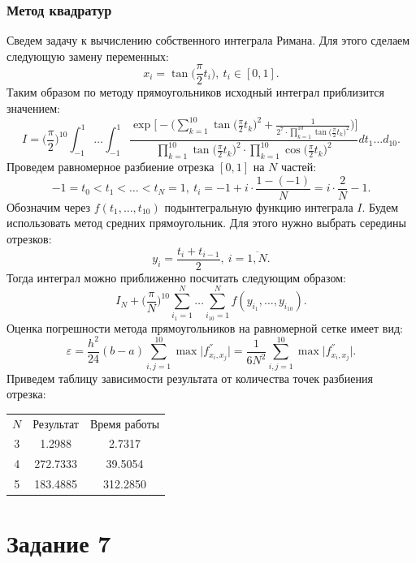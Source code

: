 \documentclass[11pt]{article}
\begin{document}
\subsubsection{Метод квадратур}
Сведем задачу к вычислению собственного интеграла Римана. Для этого сделаем следующую замену переменных:
\[ x_i = \tan\bigg(\frac{\pi}{2}t_i \bigg), \ t_i \in [0,1]. \]
Таким образом по методу прямоугольников исходный интеграл приблизится значением:
\[ I = \bigg(\frac{\pi}{2} \bigg)^{10} \int_{-1}^{1}\dots\int_{-1}^{1}\frac{\exp\Bigg[- \Bigg( \sum_{k = 1}^{10}\tan\bigg(\frac{\pi}{2}t_k\bigg)^2 + \frac{1}{2^7 \cdot \prod_{k = 1}^{10}\tan\bigg(\frac{\pi}{2}t_k\bigg)^2 }\Bigg)\Bigg]}{\prod_{k = 1}^{10}\tan\bigg(\frac{\pi}{2}t_k\bigg)^2 \cdot \prod_{k = 1}^{10}\cos\bigg(\frac{\pi}{2}t_k \bigg)^2}dt_1\dots d_{10}. \]
Проведем равномерное разбиение отрезка $[0,1]$ на $N$ частей:
\[ -1 = t_0 < t_1 < \dots < t_N = 1, \ t_i = -1 + i \cdot \frac{1 - (-1)}{N} = i \cdot \frac{2}{N} - 1. \]
Обозначим через $f(t_1,\dots,t_{10})$ подынтегральную функцию интеграла $I$. Будем использовать метод средних прямоугольник. Для этого нужно выбрать середины отрезков:
\[ y_i = \frac{t_i + t_{i -1}}{2}, \ i = \overline{1, N}. \]
Тогда интеграл можно приближенно посчитать следующим образом:
\[ I_N + \bigg( \frac{\pi}{N}\bigg)^{10} \sum_{i_1 = 1}^{N}\dots \sum_{i_{10} = 1}^{N}f(y_{i_1},\dots,y_{i_{10}}). \]
Оценка погрешности метода прямоугольников на равномерной сетке имеет вид:
\[ \varepsilon = \frac{h^2}{24}(b - a)\sum_{i,j = 1}^{10}\max \bigg|f^{''}_{x_i,x_j} \bigg| = \frac{1}{6N^2}\sum_{i,j = 1}^{10} \max \bigg|f^{''}_{x_i,x_j} \bigg|. \]
Приведем таблицу зависимости результата от количества точек разбиения отрезка:
\begin{center}
	\begin{tabular}{|c|c|c|}
		\hline
		$N$ &Результат  & Время работы \\
		3 & 1.2988 & 2.7317 \\
		4 & 272.7333 & 39.5054  \\
		5 & 183.4885 & 312.2850  \\
		
		\hline
	\end{tabular}
\end{center}
\newpage
\section{Задание 7}
\end{document}
